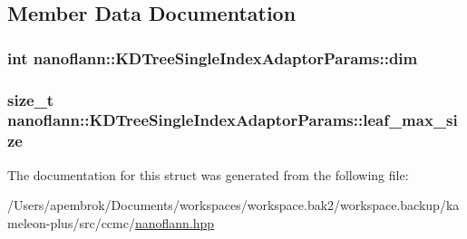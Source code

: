 \subsection{Member Data Documentation}
\hypertarget{structnanoflann_1_1_k_d_tree_single_index_adaptor_params_a3fa490f233559594e34b3c1fcb8e5057}{
\subsubsection[{dim}]{\setlength{\rightskip}{0pt plus 5cm}int nanoflann\-::\-K\-D\-Tree\-Single\-Index\-Adaptor\-Params\-::dim}}\label{structnanoflann_1_1_k_d_tree_single_index_adaptor_params_a3fa490f233559594e34b3c1fcb8e5057}
\hypertarget{structnanoflann_1_1_k_d_tree_single_index_adaptor_params_aa355e5ec6b36fbf75a77aef8b5287fca}{
\subsubsection[{leaf\-\_\-max\-\_\-size}]{\setlength{\rightskip}{0pt plus 5cm}size\-\_\-t nanoflann\-::\-K\-D\-Tree\-Single\-Index\-Adaptor\-Params\-::leaf\-\_\-max\-\_\-size}}\label{structnanoflann_1_1_k_d_tree_single_index_adaptor_params_aa355e5ec6b36fbf75a77aef8b5287fca}


The documentation for this struct was generated from the following file\-:\begin{DoxyCompactItemize}
\item 
/\-Users/apembrok/\-Documents/workspaces/workspace.\-bak2/workspace.\-backup/kameleon-\/plus/src/ccmc/\hyperlink{nanoflann_8hpp}{nanoflann.\-hpp}\end{DoxyCompactItemize}
